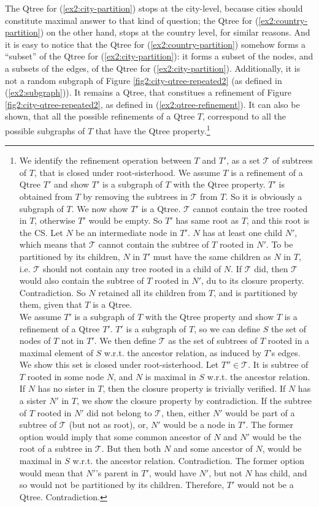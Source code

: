 The Qtree for (\ref{ex2:city-partition}) stops at the city-level, because cities should constitute maximal answer to that kind of question; the Qtree for (\ref{ex2:country-partition}) on the other hand, stops at the country level, for similar reasons. And it is easy to notice that the Qtree for (\ref{ex2:country-partition}) somehow forms a ``subset'' of the Qtree for (\ref{ex2:city-partition}): it forms a subset of the nodes, and a subsets of the edges, of the Qtree for (\ref{ex2:city-partition}). Additionally, it is not a random subgraph of Figure \ref{fig2:city-qtree-repeated2} (as defined in (\ref{ex2:subgraph})). It remains a Qtree, that constitues a refinement of Figure \ref{fig2:city-qtree-repeated2}, as defined in (\ref{ex2:qtree-refinement}). It can also be shown, that all the possible refinements of a Qtree $T$, correspond to all the possible subgraphs of $T$ that have the Qtree property.\footnote{We identify the refinement operation between $T$ and $T'$, as a set $\mathcal{T}$ of subtrees of $T$, that is closed under root-sisterhood.
	We assume $T$ is a refinement of a Qtree $T'$ and show $T'$ is a subgraph of $T$ with the Qtree property. $T'$ is obtained from $T$ by removing the subtrees in $\mathcal{T}$ from $T$. So it is obviously a subgraph of $T$. We now show $T'$ is a Qtree. $\mathcal{T}$ cannot contain the tree rooted in $T$, otherwise $T'$ would be empty. So $T'$ has same root as $T$, and this root is the CS. Let $N$ be an intermediate node in $T'$. $N$ has at least one child $N'$, which means that $\mathcal{T}$ cannot contain the subtree of $T$ rooted in $N'$. To be partitioned by its children, $N$ in $T'$ must have the same children as $N$ in $T$, i.e. $\mathcal{T}$ should not contain any tree rooted in a child of $N$. If $\mathcal{T}$ did, then $\mathcal{T}$ would also contain the subtree of $T$ rooted in $N'$, du to its closure property. Contradiction. So $N$ retained all its children from $T$, and is partitioned by them, given that $T$ is a Qtree.\\
	We assume $T'$ is a subgraph of $T$ with the Qtree property and show $T$ is a refinement of a Qtree $T'$. $T'$ is a subgraph of $T$, so we can define $S$ the set of nodes of $T$ not in $T'$. We then define $\mathcal{T}$ as the set of subtrees of $T$ rooted in a maximal element of $S$ w.r.t. the ancestor relation, as induced by $T$'s edges. We show this set is closed under root-sisterhood. Let $T'' \in \mathcal{T}$. It is subtree of $T$ rooted in some node $N$, and $N$ is maximal in $S$ w.r.t. the ancestor relation. If $N$ has no sister in $T$, then the closure property is trivially verified. If $N$ has a sister $N'$ in $T$, we show the closure property by contradiction. If the subtree of $T$ rooted in $N'$ did not belong to $\mathcal{T}$, then, either $N'$ would be part of a subtree of $\mathcal{T}$ (but not as root), or, $N'$ would be a node in $T'$. The former option would imply that some common ancestor of $N$ and $N'$ would be the root of a subtree in $\mathcal{T}$. But then both $N$ and some ancestor of $N$, would be maximal in $S$ w.r.t. the ancestor relation. Contradiction. The former option would mean that $N'$'s parent in $T'$, would have $N'$, but not $N$ has child, and so would not be partitioned by its children. Therefore, $T'$ would not be a Qtree. Contradiction.}

